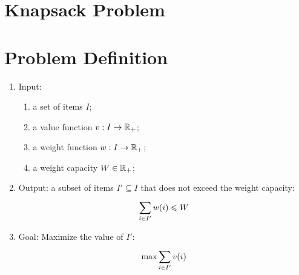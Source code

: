 \section{Knapsack Problem}

\section{Problem Definition}

\begin{enumerate}
    \item Input:
    \begin{enumerate}
        \item a set of items $I$;
        \item a value function $v : I \rightarrow \mathbb{R}_+$;
        \item a weight function $w : I \rightarrow \mathbb{R}_+$;
        \item a weight capacity $W \in \mathbb{R}_+$;
    \end{enumerate}
    \item Output: a subset of items $I' \subseteq I$ that does not exceed the weight capacity:
    \begin{equation}
        \displaystyle\sum\limits_{i \in I'}^{} w(i) \leqslant W
    \end{equation}
    \item Goal: Maximize the value of $I'$:
    \begin{equation}
        \max \displaystyle\sum\limits_{i \in I'}^{} v(i)
    \end{equation}
\end{enumerate}
